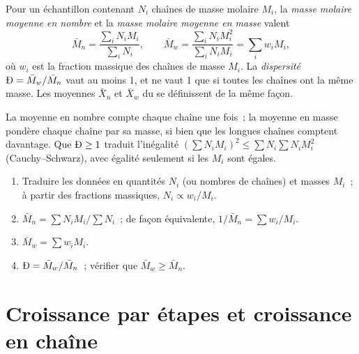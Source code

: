 \begin{definition}\label{def:b2:polymer-synthesis:averages}
Pour un échantillon contenant $N_i$ chaînes de masse molaire $M_i$, la \emph{masse molaire moyenne en nombre}
et la \emph{masse molaire moyenne en masse}
valent
\begin{equation*}
\bar M_n = \frac{\sum_i N_i M_i}{\sum_i N_i}, \qquad
\bar M_w = \frac{\sum_i N_i M_i^2}{\sum_i N_i M_i} = \sum_i w_i M_i,
\end{equation*}
où $w_i$ est la fraction massique des chaînes de masse $M_i$. La \emph{dispersité}
$\text{\DH} = \bar M_w/\bar M_n$ vaut au moins 1, et ne vaut 1 que si toutes les chaînes ont la même
masse. Les moyennes $\bar X_n$ et $\bar X_w$ du  se définissent de la même
façon.
\end{definition}

La moyenne en nombre compte chaque chaîne une fois~; la moyenne en masse pondère chaque chaîne par sa
masse, si bien que les longues chaînes comptent davantage. Que $\text{\DH} \ge 1$ traduit l'inégalité $\left(\sum N_i M_i\right)^2 \le
\sum N_i \sum N_i M_i^2$ (Cauchy--Schwarz), avec égalité seulement si les $M_i$ sont égales.

\begin{method}\label{met:b2:polymer-synthesis:averages}
\begin{enumerate}
  \item Traduire les données en quantités $N_i$ (ou nombres de chaînes) et masses $M_i$~; à partir des
        fractions massiques, $N_i \propto w_i/M_i$.
  \item $\bar M_n = \sum N_i M_i / \sum N_i$~; de façon équivalente, $1/\bar M_n = \sum w_i/M_i$.
  \item $\bar M_w = \sum w_i M_i$.
  \item $\text{\DH} = \bar M_w/\bar M_n$~; vérifier que $\bar M_w \ge \bar M_n$.
\end{enumerate}
\end{method}

\section{Croissance par étapes et croissance en chaîne}

